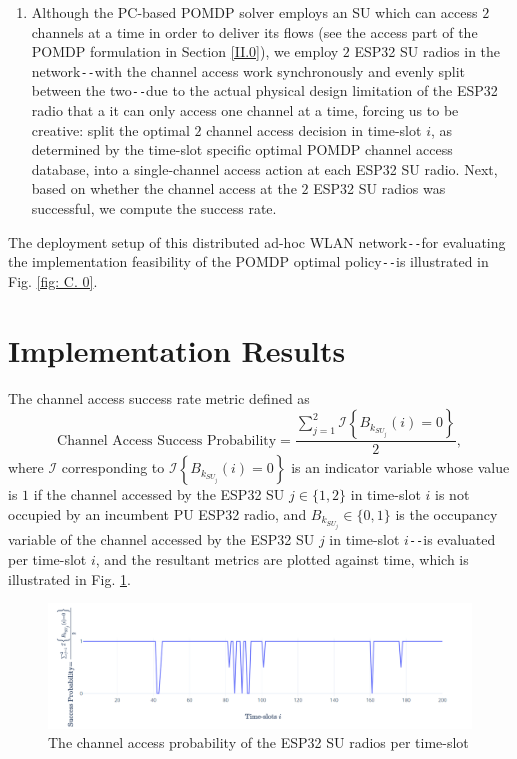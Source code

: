 \documentclass[12pt, draftcls, onecolumn]{IEEEtran}
\begin{document}
\begin{enumerate}
    \item Although the PC-based POMDP solver employs an SU which can access $2$ channels at a time in order to deliver its flows (see the access part of the POMDP formulation in Section \ref{II.0}), we employ $2$ ESP32 SU radios in the network\texttt{-{}-}with the channel access work synchronously and evenly split between the two\texttt{-{}-}due to the actual physical design limitation of the ESP32 radio that a it can only access one channel at a time, forcing us to be creative: split the optimal $2$ channel access decision in time-slot $i$, as determined by the time-slot specific optimal POMDP channel access database, into a single-channel access action at each ESP32 SU radio. Next, based on whether the channel access at the $2$ ESP32 SU radios was successful, we compute the success rate.
\end{enumerate}
The deployment setup of this distributed ad-hoc WLAN network\texttt{-{}-}for evaluating the implementation feasibility of the POMDP optimal policy\texttt{-{}-}is illustrated in Fig. \ref{fig: C. 0}.
\section{Implementation Results}\label{D.I}
The channel access success rate metric defined as
\begin{equation}\label{C.I}
    \text{Channel Access Success Probability}=\frac{\sum_{j=1}^{2}\mathcal{I}\left\{B_{k_{SU_{j}}}(i)=0\right\}}{2},
\end{equation}
where $\mathcal{I}$ corresponding to $\mathcal{I}\left\{B_{k_{SU_{j}}}(i)=0\right\}$ is an indicator variable whose value is $1$ if the channel accessed by the ESP32 SU $j{\in}\{1,2\}$ in time-slot $i$ is not occupied by an incumbent PU ESP32 radio, and $B_{k_{SU_{j}}}{\in}\{0,1\}$ is the occupancy variable of the channel accessed by the ESP32 SU $j$ in time-slot $i$\texttt{-{}-}is evaluated per time-slot $i$, and the resultant metrics are plotted against time, which is illustrated in Fig. \ref{fig:C.1}.
\begin{figure} [htb]
    \centerline{
    \includegraphics[width = 0.8\linewidth]{ESP32_Success_Probability.PNG}}
    \caption{The channel access probability of the ESP32 SU radios per time-slot}
    \label{fig:C.1}
\end{figure}
\end{document}
